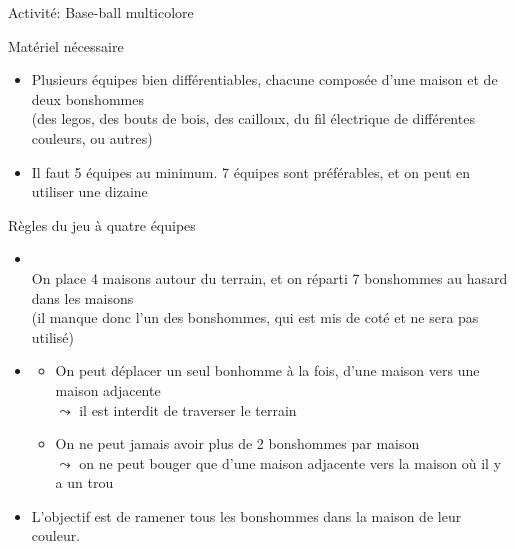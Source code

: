 \documentclass[final,hyperref={pdfpagelabels=false}]{beamer}
\renewenvironment{Coupe}{   }{   }
\renewcommand*{\normalsize}{\fontsize{\resultnormalsizeX}{\resultnormalsizeY}\selectfont}
\begin{document}
\newcommand{\maisonQuatre}[2]{\maisonPair{#1}{#2}{4}{12}{1/A,2/B,3/C,4/D}}
\newcommand{\maisonCinq}[2]{\maisonImpair{#1}{#2}{5}{20}{1/A,2/B,3/C,4/D,5/E}}
\newcommand{\maisonSix}[2]{\maisonPair{#1}{#2}{6}{24}{1/A,2/B,3/C,4/D,5/E,6/F}}
\newcommand{\maisonSept}[2]{\maisonImpair{#1}{#2}{7}{28}{1/A,2/B,3/C,4/D,5/E,6/F,7/G}}


\newcommand{\pawn}[1]{\tikz \draw node[shape=circle,fill=#1,draw=black,inner sep=.1] {~~~};}

\begin{Coupe}

\begin{frame}{Activité: Base-ball multicolore}
  \begin{block}{Matériel nécessaire}
    \begin{itemize}
    \item Plusieurs équipes bien différentiables, chacune composée d'une maison
      et de deux bonshommes\\
      (des legos, des bouts de bois, des cailloux, du fil électrique de
      différentes couleurs, ou autres)

    \item Il faut 5 équipes au minimum. 7 équipes sont préférables, et on peut
      en utiliser une dizaine
    \end{itemize}
  \end{block}

  \begin{block}{Règles du jeu à quatre équipes}
    \begin{itemize}
    \item {}~\\
      On place 4 maisons autour du terrain, et on réparti 7 bonshommes au
      hasard dans les maisons\\
     (il manque donc l'un des bonshommes, qui est mis de coté et ne sera
      pas utilisé)
    \item {}
      \begin{itemize}\normalsize
      \item On peut déplacer un seul bonhomme à la fois, d'une maison vers une
        maison adjacente\\
        $\leadsto$ il est interdit de traverser le terrain
      \item On ne peut jamais avoir plus de 2 bonshommes par maison\\
        $\leadsto$ on ne peut bouger que d'une maison adjacente vers la maison
        où il y a un trou
      \end{itemize}
    \item  {}
      L'objectif est de ramener tous les bonshommes dans la maison de leur couleur.
    \end{itemize}
  \end{block}


\end{frame}
\end{Coupe}
\end{document}
